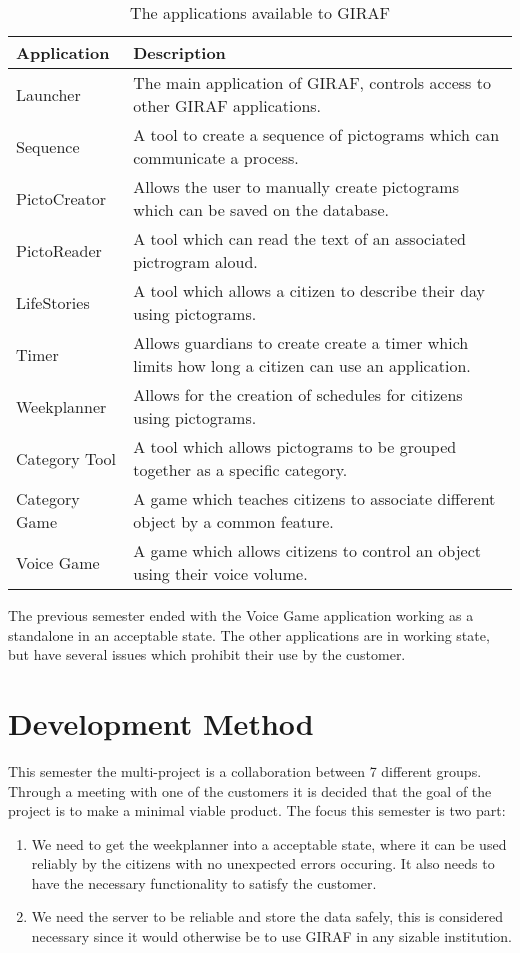 \begin{table}[H]
\centering
\begin{tabular}{|p{3cm}|p{9cm}|}
\hline
Application			& Description \\\hline
Launcher  			& The main application of GIRAF, controls access to other
GIRAF applications. \\\hline 
Sequence	       	& A tool to create a sequence of pictograms which can
communicate a process.\\\hline 
PictoCreator  	   	& Allows the user to manually create pictograms which can be
saved on the database.\\\hline
PictoReader	   		& A tool which can read the text of an associated pictrogram
aloud.\\\hline
LifeStories	   		& A tool which allows a citizen to describe their day using
pictograms.\\\hline 
Timer     	   		& Allows guardians to create create a timer which limits how
long a citizen can use an application.\\\hline 
Weekplanner 		& Allows for the creation of schedules for citizens
using pictograms. \\\hline 
Category Tool		& A tool which allows pictograms to be grouped together as a
specific category. \\\hline 
Category Game   	& A game which teaches citizens to associate different object
by a common feature. \\\hline 
Voice Game  		& A game which allows citizens to control an object using their
voice volume. \\\hline
\end{tabular}
\label{GApps} 
\caption{The applications available to GIRAF}
\end{table}



The previous semester ended with the Voice Game application working as a
standalone in an acceptable state. The other applications are in working state,
but have several issues which prohibit their use by the customer.




\section{Development Method}
This semester the multi-project is a collaboration between 7
different groups. Through a meeting with one of the customers it is
decided that the goal of the project is to make a minimal viable product. The
focus this semester is two part: 
\begin{enumerate}
  \item We need to get the weekplanner into a acceptable state, where it can be
  used reliably by the citizens with no unexpected errors occuring. It also
  needs to have the necessary functionality to satisfy the customer.
  \item We need the server to be reliable and store the data safely, this is
  considered necessary since it would otherwise be to use GIRAF in any sizable
  institution.
\end{enumerate}

